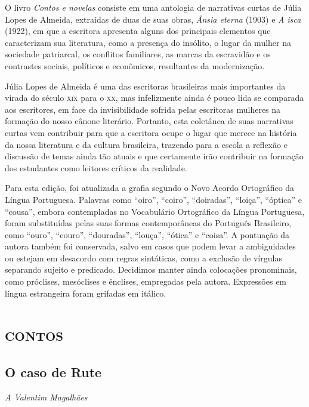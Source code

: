 
O livro \emph{Contos e novelas} consiste em uma antologia de narrativas
curtas de Júlia Lopes de Almeida, extraídas de duas de suas obras,
\emph{Ânsia eterna} (1903) e \emph{A isca} (1922), em que a escritora
apresenta alguns dos principais elementos que caracterizam sua
literatura, como a presença do insólito, o lugar da mulher na sociedade
patriarcal, os conflitos familiares, as marcas da escravidão e os
contrastes sociais, políticos e econômicos, resultantes da modernização.


Júlia Lopes de Almeida é uma das escritoras brasileiras mais importantes
da virada do século \textsc{xix} para o \textsc{xx}, mas infelizmente ainda é pouco lida
se comparada aos escritores, em face da invisibilidade sofrida pelas
escritoras mulheres na formação do nosso cânone literário. Portanto,
esta coletânea de suas narrativas curtas vem contribuir para que a
escritora ocupe o lugar que merece na história da nossa literatura e da
cultura brasileira, trazendo para a escola a reflexão e discussão de
temas ainda tão atuais e que certamente irão contribuir na formação dos
estudantes como leitores críticos da realidade.

Para esta edição, foi atualizada a grafia segundo o Novo Acordo
Ortográfico da Língua Portuguesa. Palavras como ``oiro'', ``coiro'',
``doiradas'', ``loiça'', ``óptica'' e ``cousa'', embora contempladas no
Vocabulário Ortográfico da Língua Portuguesa, foram substituídas pelas
suas formas contemporâneas do Português Brasileiro, como ``ouro'',
``couro'', ``douradas'', ``louça'', ``ótica'' e ``coisa''. A pontuação
da autora também foi conservada, salvo em casos que podem levar a
ambiguidades ou estejam em desacordo com regras sintáticas, como a
exclusão de vírgulas separando sujeito e predicado. Decidimos manter
ainda colocações pronominais, como próclises, mesóclises e ênclises,
empregadas pela autora. Expressões em língua estrangeira foram grifadas
em itálico.


\part{\textsc{contos}}

\chapter{O caso de Rute}

\hfill\emph{A Valentim Magalhães}

